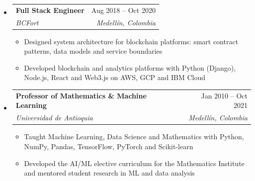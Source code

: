 \documentclass[letterpaper,10pt]{article}
\makeatletter
\newcommand{\resumeSubheading}[4]{
  \vspace{-2pt}
  \item[]
  \begin{tabular*}{\textwidth}{@{\extracolsep{\fill}}l r}
    \textbf{#1} & #2 \\
    \textit{#3} & \textit{#4} \\
  \end{tabular*}
  \vspace{-5pt}
}
\makeatother
\begin{document}
\begin{itemize}[leftmargin=0pt, itemindent=0pt, label={}, itemsep=1pt]
\begin{itemize}[leftmargin=*, itemsep=0pt]
    \item Built and scaled microservices for AI/ML and data-intensive applications; designed ETL pipelines and custom Django ORM extensions
    \item Did code reviews on a distributed team across Canada, the US and Latin America
\end{itemize}
\resumeSubheading
{Full Stack Engineer}{Aug 2018 -- Oct 2020}
{BCFort}{Medell\'in, Colombia}
\begin{itemize}[leftmargin=*, itemsep=0pt]
    \item Designed system architecture for blockchain platforms: smart contract patterns, data models and service boundaries
    \item Developed blockchain and analytics platforms with Python (Django), Node.js, React and Web3.js on AWS, GCP and IBM Cloud
\end{itemize}
\resumeSubheading
{Professor of Mathematics \& Machine Learning}{Jan 2010 -- Oct 2021}
{Universidad de Antioquia}{Medell\'in, Colombia}
\begin{itemize}[leftmargin=*, itemsep=0pt]
    \item Taught Machine Learning, Data Science and Mathematics with Python, NumPy, Pandas, TensorFlow, PyTorch and Scikit-learn
    \item Developed the AI/ML elective curriculum for the Mathematics Institute and mentored student research in ML and data analysis
\end{itemize}
\end{itemize}
\end{document}
